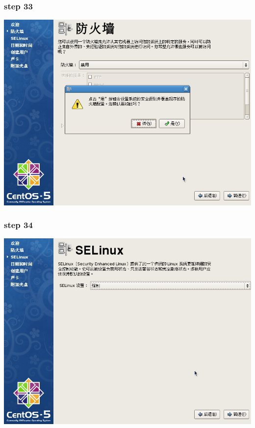 \documentclass[xcolor=svgnames,presentation]{beamer}
\begin{document}
\begin{frame}
\frametitle{step 33}
\label{sec-2-33}

\begin{center}
\includegraphics[width=.9\linewidth]{img/img55.png}
\end{center}
\end{frame}
\begin{frame}
\frametitle{step 34}
\label{sec-2-34}

\begin{center}
\includegraphics[width=.9\linewidth]{img/img56.png}
\end{center}
\end{frame}
\end{document}
